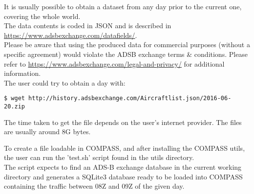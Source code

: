 It is usually possible to obtain a dataset from any day prior to the current one, covering the whole world. \\

The data contents is coded in JSON and is described in \url{https://www.adsbexchange.com/datafields/}. \\

Please be aware that using the produced data for commercial purposes (without a specific agreement) would violate the ADSB exchange terms \& conditions. Please refer to \url{https://www.adsbexchange.com/legal-and-privacy/} for additional information.\\

The user could try to obtain a day with:
\begin{lstlisting}
$ wget http://history.adsbexchange.com/Aircraftlist.json/2016-06-20.zip
\end{lstlisting}

The time taken to get the file depends on the user's internet provider. The files are usually around 8G bytes.

To create a file loadable in COMPASS, and after installing the COMPASS utils, the user can run the 'test.sh' script found in the utils directory. \\

The script expects to find an ADS-B exchange database in the current working directory and generates a SQLite3 database ready to be loaded into COMPASS containing the traffic between 08Z and 09Z of the given day.
